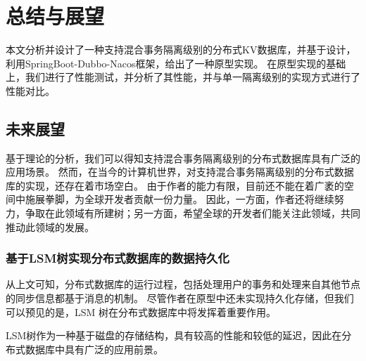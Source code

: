 \chapter{总结与展望}

本文分析并设计了一种支持混合事务隔离级别的分布式KV数据库，并基于设计，利用SpringBoot-Dubbo-Nacos框架，给出了一种原型实现。
在原型实现的基础上，我们进行了性能测试，并分析了其性能，并与单一隔离级别的实现方式进行了性能对比。


\section{未来展望}

基于理论的分析，我们可以得知支持混合事务隔离级别的分布式数据库具有广泛的应用场景。
然而，在当今的计算机世界，对支持混合事务隔离级别的分布式数据库的实现，还存在着市场空白。
由于作者的能力有限，目前还不能在着广袤的空间中施展拳脚，为全球开发者贡献一份力量。
因此，一方面，作者还将继续努力，争取在此领域有所建树；另一方面，希望全球的开发者们能关注此领域，共同推动此领域的发展。

\subsection{基于LSM树实现分布式数据库的数据持久化}
从上文可知，分布式数据库的运行过程，包括处理用户的事务和处理来自其他节点的同步信息都基于消息的机制。
尽管作者在原型中还未实现持久化存储，但我们可以预见的是，LSM 树在分布式数据库中将发挥着重要作用。

LSM树作为一种基于磁盘的存储结构，具有较高的性能和较低的延迟，因此在分布式数据库中具有广泛的应用前景。
